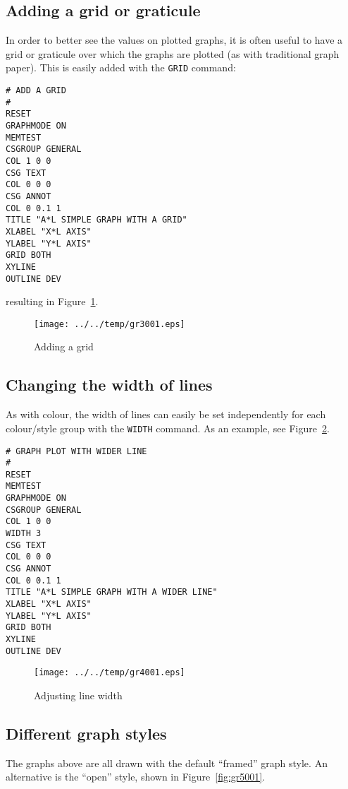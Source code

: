 \documentclass[a4paper,twoside,11pt]{article}
\makeatletter
\def\maxwidth{%
  \ifdim\Gin@nat@width>\linewidth
    \linewidth
  \else
    \Gin@nat@width
  \fi
}
\newcommand{\newpara}{\par\vspace{4mm}\noindent}
\makeatother
\begin{document}
\subsection{Adding a grid or graticule}\label{adding-a-grid-or-graticule}
\newpara
In order to better see the values on plotted graphs, it is often useful
to have a grid or graticule over which the graphs are plotted (as with
traditional graph paper). This is easily added with the \texttt{GRID}
command:

\begin{lstlisting}
# ADD A GRID
#
RESET
GRAPHMODE ON
MEMTEST
CSGROUP GENERAL
COL 1 0 0
CSG TEXT
COL 0 0 0
CSG ANNOT
COL 0 0.1 1
TITLE "A*L SIMPLE GRAPH WITH A GRID"
XLABEL "X*L AXIS"
YLABEL "Y*L AXIS"
GRID BOTH
XYLINE
OUTLINE DEV
\end{lstlisting}

\newpara
resulting in Figure~\ref{fig:gr3001}.

\begin{figure}
  \centering
  \texttt{[image: ../../temp/gr3001.eps]}
  \caption{Adding a grid}
  \label{fig:gr3001}
\end{figure}


\subsection{Changing the width of lines}\label{changing-the-width-of-lines}
\newpara
As with colour, the width of lines can easily be set independently for
each colour/style group with the \texttt{WIDTH} command. As an example,
see Figure~\ref{fig:gr4001}.

\begin{lstlisting}
# GRAPH PLOT WITH WIDER LINE
#
RESET
MEMTEST
GRAPHMODE ON
CSGROUP GENERAL
COL 1 0 0
WIDTH 3
CSG TEXT
COL 0 0 0
CSG ANNOT
COL 0 0.1 1
TITLE "A*L SIMPLE GRAPH WITH A WIDER LINE"
XLABEL "X*L AXIS"
YLABEL "Y*L AXIS"
GRID BOTH
XYLINE
OUTLINE DEV
\end{lstlisting}

\begin{figure}
  \centering
  \texttt{[image: ../../temp/gr4001.eps]}
  \caption{Adjusting line width}
  \label{fig:gr4001}
\end{figure}

\subsection{Different graph styles}\label{different-graph-styles}
\newpara
The graphs above are all drawn with the default ``framed'' graph style.
An alternative is the ``open'' style, shown in Figure~\ref{fig:gr5001}.
\end{document}
